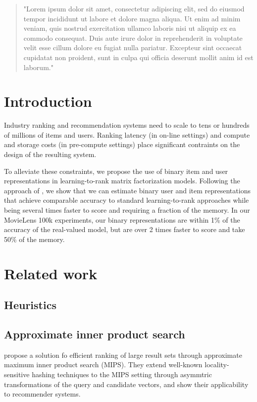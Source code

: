 \documentclass[sigconf]{acmart}
\begin{document}
\begin{abstract}
  "Lorem ipsum dolor sit amet, consectetur adipiscing elit, sed do eiusmod tempor incididunt ut labore et dolore magna aliqua. Ut enim ad minim veniam, quis nostrud exercitation ullamco laboris nisi ut aliquip ex ea commodo consequat. Duis aute irure dolor in reprehenderit in voluptate velit esse cillum dolore eu fugiat nulla pariatur. Excepteur sint occaecat cupidatat non proident, sunt in culpa qui officia deserunt mollit anim id est laborum."
\end{abstract}

\maketitle

\section{Introduction}

Industry ranking and recommendation systems need to scale to tens or hundreds of millions of items and users. Ranking latency (in on-line settings) and compute and storage costs (in pre-compute settings) place significant contraints on the design of the resulting system.

To alleviate these constraints, we propose the use of binary item and user representations in learning-to-rank matrix factorization models. Following the approach of \cite{rastegari2016xnor}, we show that we can estimate binary user and item representations that achieve comparable accuracy to standard learning-to-rank approaches while being several times faster to score and requiring a fraction of the memory. In our MovieLens 100k experiments, our binary representations are within 1\% of the accuracy of the real-valued model, but are over 2 times faster to score and take 50\% of the memory.

\section{Related work}
\subsection{Heuristics}
\subsection{Approximate inner product search}
\cite{shrivastava2014asymmetric} propose a solution fo efficient ranking of large result sets through approximate maximum inner product search (MIPS). They extend well-known \citep{indyk1998approximate} locality-sensitive hashing techniques to the MIPS setting through asymmtric transformations of the query and candidate vectors, and show their applicability to recommender systems.
\end{document}
